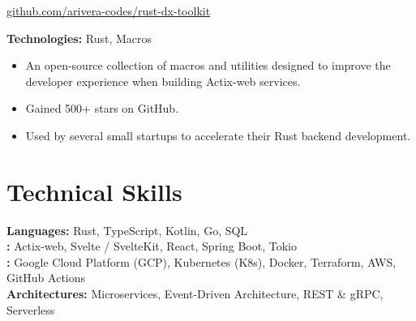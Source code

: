 \documentclass[11pt,letterpaper]{article}
\begin{document}
    
    
        \par{\footnotesize {} \href{github.com/arivera-codes/rust-dx-toolkit}{github.com/arivera-codes/rust-dx-toolkit}}
    
    
    
        \par{\footnotesize\color{accentcolor}\textbf{Technologies:} Rust, Macros }
    
    
    \vspace{2pt}
    \begin{itemize}[label=\textbullet]
        \item An open-source collection of macros and utilities designed to improve the developer experience when building Actix-web services.
        
            
               \item Gained 500+ stars on GitHub.
            
               \item Used by several small startups to accelerate their Rust backend development.
            
        
    \end{itemize}
    \vspace{4pt}




\section{Technical Skills}

    \textbf{\color{sectioncolor}Languages:} \hfill\color{textcolor}Rust, TypeScript, Kotlin, Go, SQL \\

    \textbf{\color{sectioncolor}:} \hfill\color{textcolor}Actix-web, Svelte / SvelteKit, React, Spring Boot, Tokio \\

    \textbf{\color{sectioncolor}:} \hfill\color{textcolor}Google Cloud Platform (GCP), Kubernetes (K8s), Docker, Terraform, AWS, GitHub Actions \\

    \textbf{\color{sectioncolor}Architectures:} \hfill\color{textcolor}Microservices, Event-Driven Architecture, REST \& gRPC, Serverless \\
\end{document}

